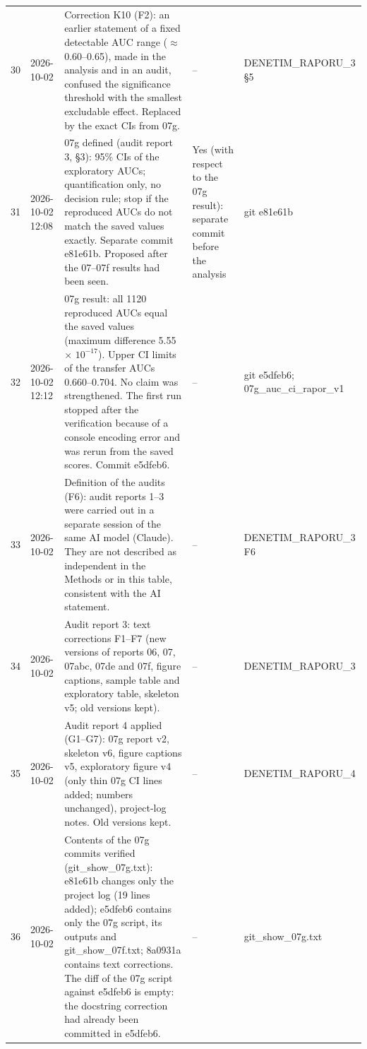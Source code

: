 \begin{longtable}{@{}p{0.6cm}p{1.9cm}p{6.8cm}p{2.8cm}p{2.3cm}@{}}
30 & \raggedright 2026-10-02 & Correction K10 (F2): an earlier statement of a fixed detectable AUC range ($\approx$0.60--0.65), made in the analysis and in an audit, confused the significance threshold with the smallest excludable effect. Replaced by the exact CIs from 07g. & \raggedright -- & \raggedright DENETIM\_\allowbreak{}RAPORU\_\allowbreak{}3 \S{}5 \tabularnewline
31 & \raggedright 2026-10-02 12:08 & 07g defined (audit report 3, \S{}3): 95\% CIs of the exploratory AUCs; quantification only, no decision rule; stop if the reproduced AUCs do not match the saved values exactly. Separate commit e81e61b. Proposed after the 07--07f results had been seen. & \raggedright Yes (with respect to the 07g result): separate commit before the analysis & \raggedright git e81e61b \tabularnewline
32 & \raggedright 2026-10-02 12:12 & 07g result: all 1120 reproduced AUCs equal the saved values (maximum difference 5.55 $\times$ $10^{-17}$). Upper CI limits of the transfer AUCs 0.660--0.704. No claim was strengthened. The first run stopped after the verification because of a console encoding error and was rerun from the saved scores. Commit e5dfeb6. & \raggedright -- & \raggedright git e5dfeb6; 07g\_\allowbreak{}auc\_\allowbreak{}ci\_\allowbreak{}rapor\_\allowbreak{}v1 \tabularnewline
33 & \raggedright 2026-10-02 & Definition of the audits (F6): audit reports 1--3 were carried out in a separate session of the same AI model (Claude). They are not described as independent in the Methods or in this table, consistent with the AI statement. & \raggedright -- & \raggedright DENETIM\_\allowbreak{}RAPORU\_\allowbreak{}3 F6 \tabularnewline
34 & \raggedright 2026-10-02 & Audit report 3: text corrections F1--F7 (new versions of reports 06, 07, 07abc, 07de and 07f, figure captions, sample table and exploratory table, skeleton v5; old versions kept). & \raggedright -- & \raggedright DENETIM\_\allowbreak{}RAPORU\_\allowbreak{}3 \tabularnewline
35 & \raggedright 2026-10-02 & Audit report 4 applied (G1--G7): 07g report v2, skeleton v6, figure captions v5, exploratory figure v4 (only thin 07g CI lines added; numbers unchanged), project-log notes. Old versions kept. & \raggedright -- & \raggedright DENETIM\_\allowbreak{}RAPORU\_\allowbreak{}4 \tabularnewline
36 & \raggedright 2026-10-02 & Contents of the 07g commits verified (git\_\allowbreak{}show\_\allowbreak{}07g.txt): e81e61b changes only the project log (19 lines added); e5dfeb6 contains only the 07g script, its outputs and git\_\allowbreak{}show\_\allowbreak{}07f.txt; 8a0931a contains text corrections. The diff of the 07g script against e5dfeb6 is empty: the docstring correction had already been committed in e5dfeb6. & \raggedright -- & \raggedright git\_\allowbreak{}show\_\allowbreak{}07g.txt \tabularnewline

\end{longtable}
